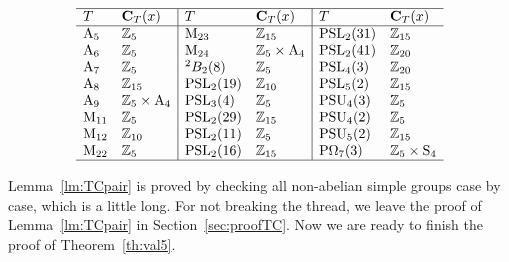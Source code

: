 \documentclass[12pt,reqno]{amsart}
\newcommand\A{\mathrm{A}} \newcommand\AGL{\mathrm{AGL}} \newcommand\AGammaL{\mathrm{A\Gamma L}} \newcommand\Alt{\mathrm{Alt}} \newcommand\ASL{\mathrm{ASL}} \newcommand\ASigmaL{\mathrm{A \Sigma L}} \newcommand\Aut{\mathrm{Aut}}
\def\C{\mathbf{C}}   \newcommand\Cay{\mathrm{Cay}}   \newcommand\Cos{\mathrm{Cos}} \newcommand{\CGammaSp}{\mathrm{C\Gamma Sp}}
\newcommand\M{\mathrm{M}} \newcommand{\magma}{{\sc Magma}} \renewcommand \mod{{\rm mod~}}
\numberwithin {equation} {section}
\begin{document}
 \begin{table}[htb]
\caption{Simple groups $T$ with $\C_T(x)\in \{ \ZZ_5,\ZZ_{10},\ZZ_{15},\ZZ_{20},\ZZ_5 \times \A_4, \ZZ_5 \times\Sy_4 \}$.  }\label{tb:cT}
\[
 \begin{array}{  l  l | ll | ll  } \hline
T & \C_T(x) & T & \C_T(x) & T & \C_T(x)  \\ \hline
 \A_5  &\ZZ_5& \M_{23} &\ZZ_{15} &\PSL_2(31) &\ZZ_{15}   \\
 \A_6  &\ZZ_5 & \M_{24} &\ZZ_{5}  \times \A_4 &\PSL_2(41) &\ZZ_{20}   \\
  \A_7 &\ZZ_5 &  {}^2B_2(8) &\ZZ_{5} & \PSL_4(3)& \ZZ_{20}   \\
  \A_8 &\ZZ_{15} & \PSL_2(19) &\ZZ_{10}   &     \PSL_5(2)& \ZZ_{15}   \\
  \A_9 &\ZZ_{5} \times \A_4 &  \PSL_3(4) &\ZZ_{5} & \PSU_4(3) &\ZZ_{5}   \\
  \M_{11} &\ZZ_5 &  \PSL_2(29) &\ZZ_{15}  &  \PSU_4(2) &\ZZ_{5}  \\
  \M_{12} &\ZZ_{10} &  \PSL_2(11) &\ZZ_{5}  & \PSU_5(2) &\ZZ_{15}   \\
  \M_{22} &\ZZ_5  &  \PSL_2(16) &\ZZ_{15}  &  \POmega_7(3) &\ZZ_{5} \times\Sy_4   \\
 \hline
 \end{array}
\]
\end{table}


Lemma~\ref{lm:TCpair} is proved by checking all non-abelian simple groups case by case, which is a little long. For not breaking the thread, we leave the proof of Lemma~\ref{lm:TCpair} in Section~\ref{sec:proofTC}. Now we are ready to finish the proof of Theorem~\ref{th:val5}.
\end{document}
